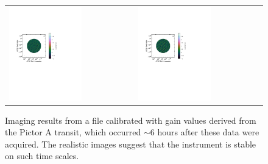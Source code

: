 \begin{figure}
\begin{tabular}{ll}
\includegraphics[clip, trim=0.1cm 11cm 6cm 6cm, width=0.6\textwidth]{chapters/polcal/figures/47501-U-improved.pdf} &
\includegraphics[clip, trim=0.1cm 11cm 6cm 6cm, width=0.6\textwidth]{chapters/polcal/figures/47501-V-improved.pdf} \\
\end{tabular}
\caption[Imaging results from a file calibrated with gain values derived from the Pictor A transit, which occurred $\sim$6 hours after these data were acquired.]{Imaging results from a file calibrated with gain values derived from the Pictor A transit, which occurred $\sim$6 hours after these data were acquired. The realistic images suggest that the instrument is stable on such time scales.}
\label{fig:polcal_img_LST05}
\end{figure}

